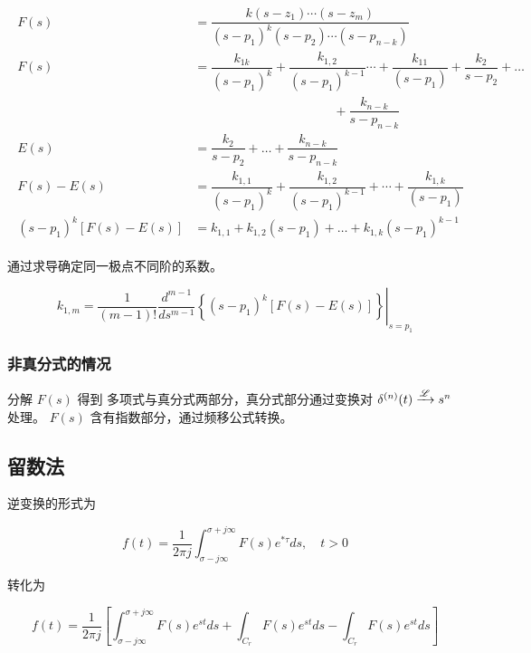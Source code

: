 \documentclass[cn,11pt,chinese,black,simple]{../elegantbook}
\begin{document}
\[\begin{array}{c}
    \begin{aligned}
        F(s)&=\dfrac{k\left(s-z_{1}\right) \cdots\left(s-z_{m}\right)}{\left(s-p_{1}\right)^{k}\left(s-p_{2}\right) \cdots\left(s-p_{n-k}\right)} \\
        F(s)&=\dfrac{k_{1 k}}{\left(s-p_{1}\right)^{k}}+\dfrac{k_{1,2}}{\left(s-p_{1}\right)^{k-1}} \cdots+\dfrac{k_{11}}{\left(s-p_{1}\right)}+\dfrac{k_{2}}{s-p_{2}}+\ldots \\ 
        & \quad\quad\quad\quad\quad\quad\quad\quad\quad\quad\quad+\dfrac{k_{n-k}}{s-p_{n-k}} \\
        E(s)&=\dfrac{k_{2}}{s-p_{2}}+\ldots+\dfrac{k_{n-k}}{s-p_{n-k}} \\
        F(s)-E(s)&=\dfrac{k_{1,1}}{\left(s-p_{1}\right)^{k}}+\dfrac{k_{1,2}}{\left(s-p_{1}\right)^{k-1}}+\cdots+\dfrac{k_{1, k}}{\left(s-p_{1}\right)} \\
        \left(s-p_{1}\right)^{k}[F(s)-E(s)]&=k_{1,1}+k_{1,2}\left(s-p_{1}\right)+\ldots+k_{1, k}\left(s-p_{1}\right)^{k-1}
    \end{aligned}
\end{array}\]

通过求导确定同一极点不同阶的系数。

\[k_{1, m}=\left.\dfrac{1}{(m-1) !} \dfrac{ d ^{m-1}}{ d s^{m-1}}\left\{\left(s-p_{1}\right)^{k}[F(s)-E(s)]\right\}\right|_{s=p_{1}}\]

\subsubsection{非真分式的情况}

分解 \(F(s)\) 得到 多项式与真分式两部分，真分式部分通过变换对 \(\delta^{(n)}(t) \xrightarrow{\mathscr{L}} s^n\) 处理。
\(F(s)\) 含有指数部分，通过频移公式转换。

\subsection{留数法}

逆变换的形式为

\[f(t)=\dfrac{1}{2 \pi j } \int_{\sigma- j \infty}^{\sigma+j \infty} F(s) e^{* \tau} d s, \quad t>0 \]


转化为

\[f(t)=\dfrac{1}{2 \pi j }\left[\int_{\sigma- j \infty}^{\sigma+ j \infty} F(s) e^{s t } d s+\int_{C_{r}} F(s) e^{s t} d s-\int_{C_{r}} F(s) e^{s t} d s\right]\]
\end{document}

